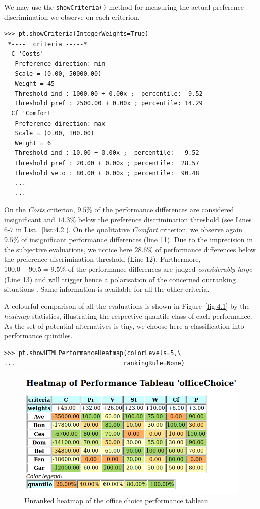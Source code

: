 We may use the \texttt{showCriteria()} method for measuring the actual preference discrimination we observe on each criterion.
\begin{lstlisting}[caption={Inspecting the performance criteria.},label=list:4.2]
>>> pt.showCriteria(IntegerWeights=True)
 *----  criteria -----*
  C 'Costs'
   Preference direction: min
   Scale = (0.00, 50000.00)
   Weight = 45
   Threshold ind : 1000.00 + 0.00x ;  percentile:  9.52
   Threshold pref : 2500.00 + 0.00x ; percentile: 14.29
  Cf 'Comfort'
   Preference direction: max
   Scale = (0.00, 100.00)
   Weight = 6
   Threshold ind : 10.00 + 0.00x ;  percentile:   9.52
   Threshold pref : 20.00 + 0.00x ; percentile:  28.57
   Threshold veto : 80.00 + 0.00x ; percentile:  90.48
   ...
   ...
\end{lstlisting}

On the \emph{Costs} criterion, $9.5\%$ of the performance differences are considered insignificant and $14.3\%$ below the preference discrimination threshold (see Lines 6-7 in List.~\vref{list:4.2}). On the qualitative \emph{Comfort} criterion, we observe again $9.5\%$ of insignificant performance differences (line 11). Due to the imprecision in the subjective evaluations, we notice here $28.6\%$ of performance differences below the preference discrimination threshold (Line 12). Furthermore, $100.0 - 90.5 = 9.5\%$ of the performance differences are judged \emph{considerably large} (Line 13) and will trigger hence a polarisation of the concerned outranking situations \citep{BIS-2013}. Same information is available for all the other criteria. 
 
A colourful comparison of all the evaluations is shown in Figure~\vref{fig:4.1} by the \emph{heatmap} statistics, illustrating the respective quantile class of each performance. As the set of potential alternatives is tiny, we choose here a classification into performance quintiles.
\begin{lstlisting}
>>> pt.showHTMLPerformanceHeatmap(colorLevels=5,\
...                              rankingRule=None)
\end{lstlisting}
    \begin{figure}[ht]
\includegraphics[width=\hsize]{Figures/4-1-officeChoiceHeatmap.png}
\caption{Unranked heatmap of the office choice performance tableau}
\label{fig:4.1}       %
\end{figure}


